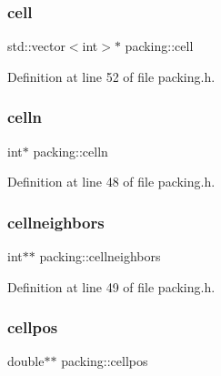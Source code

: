 \subsubsection{\texorpdfstring{cell}{cell}}
{\footnotesize\ttfamily std\+::vector$<$int$>$$\ast$ packing\+::cell\hspace{0.3cm}{\ttfamily [protected]}}



Definition at line 52 of file packing.\+h.

\mbox{\label{classpacking_ae917ff801cb46aad3cb68a44acce4020}} 
\subsubsection{\texorpdfstring{celln}{celln}}
{\footnotesize\ttfamily int$\ast$ packing\+::celln\hspace{0.3cm}{\ttfamily [protected]}}



Definition at line 48 of file packing.\+h.

\mbox{\label{classpacking_a644c3ce4ed2caba0c84f30af9f7d58a8}} 
\subsubsection{\texorpdfstring{cellneighbors}{cellneighbors}}
{\footnotesize\ttfamily int$\ast$$\ast$ packing\+::cellneighbors\hspace{0.3cm}{\ttfamily [protected]}}



Definition at line 49 of file packing.\+h.

\mbox{\label{classpacking_a4b3af5f349b64a433c53382610fb6563}} 
\subsubsection{\texorpdfstring{cellpos}{cellpos}}
{\footnotesize\ttfamily double$\ast$$\ast$ packing\+::cellpos\hspace{0.3cm}{\ttfamily [protected]}}



